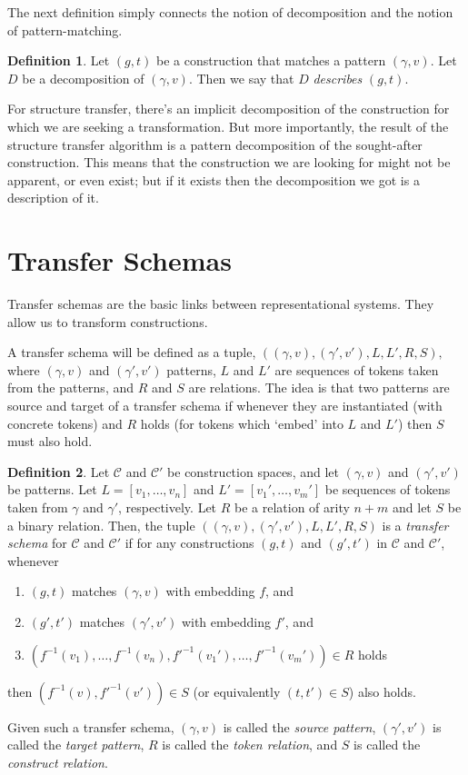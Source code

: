 \documentclass[a4paper]{article}
\theoremstyle{definition}
\newtheorem{definition}{Definition}
\begin{document}
	The next definition simply connects the notion of decomposition and the notion of pattern-matching.
	\begin{definition}
		Let $(g,t)$ be a construction that matches a pattern $(\gamma,v)$. Let $D$ be a decomposition of $(\gamma,v)$. Then we say that $D$ \textit{describes} $(g,t)$.
	\end{definition}

	For structure transfer, there's an implicit decomposition of the construction for which we are seeking a transformation. But more importantly, the result of the structure transfer algorithm is a pattern decomposition of the sought-after construction. This means that the construction we are looking for might not be apparent, or even exist; but if it exists then the decomposition we got is a description of it.

	\section{Transfer Schemas}
	Transfer schemas are the basic links between representational systems. They allow us to transform constructions.

	A transfer schema will be defined as a tuple, $((\gamma,v),(\gamma',v'),L,L',R, S),$
	where $(\gamma,v)$ and $(\gamma',v')$ patterns, $L$ and $L'$ are sequences of tokens taken from the patterns, and $R$ and $S$ are relations. The idea is that two patterns are source and target of a transfer schema if whenever they are instantiated (with concrete tokens) and $R$ holds (for tokens which `embed' into $L$ and $L'$) then $S$ must also hold.

	\newpage
	\begin{definition}
		Let $\mathcal{C}$ and $\mathcal{C}'$ be construction spaces, and let $(\gamma,v)$ and $(\gamma',v')$ be patterns. Let $L=[v_1,\ldots,v_n]$ and $L'=[v_1',\ldots,v_m']$ be sequences of tokens taken from $\gamma$ and $\gamma'$, respectively. Let $R$ be a relation of arity $n+m$ and let $S$ be a binary relation. Then, the tuple $((\gamma,v),(\gamma',v'),L,L',R, S)$ is a \textit{transfer schema} for $\mathcal{C}$ and $\mathcal{C}'$ if
		for any constructions $(g,t)$ and $(g',t')$ in $\mathcal{C}$ and $\mathcal{C}'$, whenever
		\begin{enumerate}[itemsep=1pt]
			\item $(g,t)$ matches $(\gamma,v)$ with embedding $f$, and
			\item $(g',t')$ matches $(\gamma',v')$ with embedding $f'$, and
			\item $(f^{-1}(v_1),\ldots,f^{-1}(v_n),f'^{-1}(v_1'),\ldots,f'^{-1}(v_m')) \in R$ holds
		\end{enumerate}
		then $(f^{-1}(v),f'^{-1}(v'))\in S$ (or equivalently $(t,t')\in S$) also holds.

		Given such a transfer schema, $(\gamma,v)$ is called the \textit{source pattern}, $(\gamma',v')$ is called the \textit{target pattern}, $R$ is called the \textit{token relation}, and $S$ is called the \textit{construct relation}.
	\end{definition}
\end{document}
